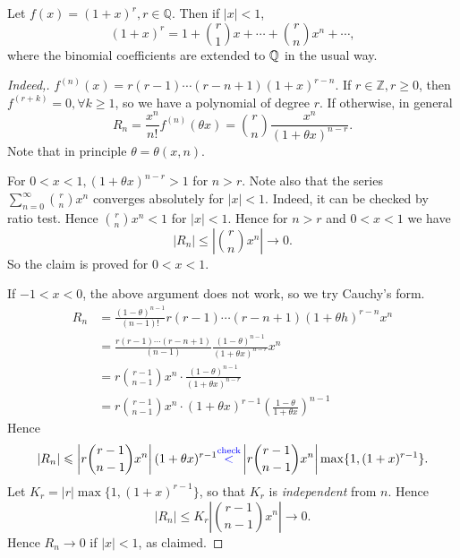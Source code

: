 \begin{example}
    Let $ f(x) = (1+x)^r,r\in \mathbb{Q} $. Then if $ |x|<1 $, 
    \[
        (1+x)^r = 1 + \binom{r}{1}x+ \cdots + \binom{r}{n}x^n+ \cdots ,
    \]
    where the binomial coefficients are extended to $\bbQ$ in the usual way.

    \begin{proof}[Indeed,]
        $ f^{(n)}(x) = r(r-1)\cdots (r-n+1)(1+x)^{r-n} $. If $ r\in \mathbb{Z},r\ge 0 $, then $ f^{(r+k)}=0,\forall k\ge 1 $, so we have a polynomial of degree $r$. If otherwise, in general
        \[
            R_n = \frac{x^n}{n!}f^{(n)}(\theta x) = \binom{r}{n}\frac{x^n}{(1+\theta x)^{n-r}}.
        \]
        Note that in principle $ \theta=\theta(x,n) $. 
        
        For $ 0<x<1, (1+\theta x)^{n-r}>1 $ for $n>r$. Note also that the series $ \sum_{n=0}^{\infty}\binom{r}{n}x^n $ converges absolutely for $ |x|<1 $. Indeed, it can be checked by ratio test. Hence $ \binom{r}{n}x^n<1 $ for $ |x|<1 $. Hence for $n>r$ and $0<x<1$ we have 
        \[
            |R_n|\le \left| \binom{r}{n}x^n \right|\to 0. 
        \]
        So the claim is proved for $ 0<x<1 $.
    
        If $ -1<x<0 $, the above argument does not work, so we try Cauchy's form.
        \begin{align*}
            R_n &= \frac{(1-\theta)^{n-1}}{(n-1)!}r(r-1)\cdots (r-n+1)(1+\theta h)^{r-n}x^n\\ 
            &= \frac{r(r-1)\cdots (r-n+1)}{(n-1)}\frac{(1-\theta)^{n-1}}{(1+\theta x)^{n-r}}x^n\\ 
            &=  r \binom{r-1}{n-1}x^n \cdot \frac{(1-\theta)^{n-1}}{(1+\theta x)^{n-r}}\\ 
            &= r \binom{r-1}{n-1}x^n \cdot(1+\theta x)^{r-1}\left( \frac{1-\theta}{1+\theta x} \right)^{n-1}
        \end{align*}
        Hence
        \[
            \left| R_n \right| \le \left| r\binom{r-1}{n-1}x^n \right| (1+\theta x)^{r-1} {\color{blue}\overset{\text{check}}{<}}  \left| r\binom{r-1}{n-1}x^n \right| \max \{1,(1+x)^{r-1}\}.
        \]
        Let $ K_r = |r| \max \{1,(1+x)^{r-1}\} $, so that $K_r$ is \textit{independent} from $n$. Hence 
        \[
            |R_n|\le K_r \left| \binom{r-1}{n-1}x^n \right| \to 0.
        \]
        Hence $ R_n\to 0 $ if $|x|<1$, as claimed.
    \end{proof}
\end{example}

